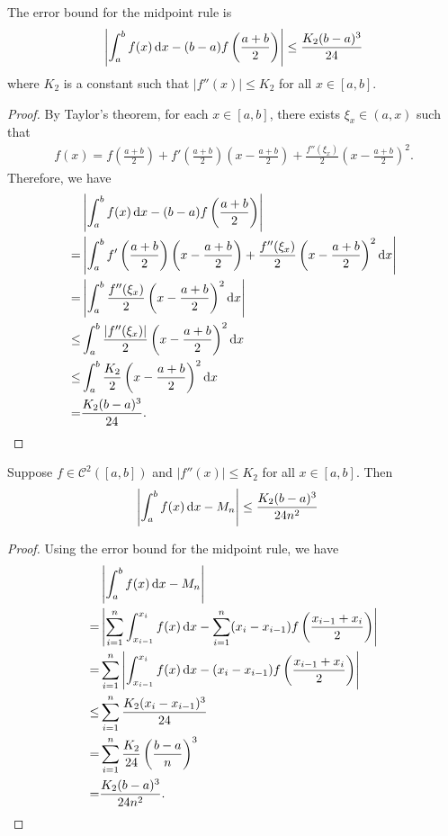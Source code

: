 \begin{theorem}
    The error bound for the midpoint rule is
    \begin{align*}
        \left|\int_{a}^{b} f(x) \operatorname*{d\!} x - (b-a)f\left(\frac{a+b}{2}\right)\right| \le \frac{K_2(b-a)^3}{24}
    \end{align*}
    where $K_2$ is a constant such that $|f''(x)| \le K_2$ for all $x \in [a,b]$.
\end{theorem}
\begin{proof}
    By Taylor's theorem, for each $x \in [a,b]$, there exists $\xi_x \in (a,x)$ such that
    \begin{align*}
        f(x) = f\left(\frac{a+b}{2}\right) + f'\left(\frac{a+b}{2}\right)\left(x-\frac{a+b}{2}\right) + \frac{f''(\xi_x)}{2}\left(x-\frac{a+b}{2}\right)^2.
    \end{align*}
    Therefore, we have
    \begin{align*}
        &\left|\int_{a}^{b} f(x) \operatorname*{d\!} x - (b-a)f\left(\frac{a+b}{2}\right)\right|\\
        =& \left|\int_{a}^{b} f'\left(\frac{a+b}{2}\right)\left(x-\frac{a+b}{2}\right) + \frac{f''(\xi_x)}{2}\left(x-\frac{a+b}{2}\right)^2 \operatorname*{d\!} x\right|\\
        =& \left|\int_{a}^{b} \frac{f''(\xi_x)}{2}\left(x-\frac{a+b}{2}\right)^2 \operatorname*{d\!} x\right|\\
        \le& \int_{a}^{b} \frac{|f''(\xi_x)|}{2}\left(x-\frac{a+b}{2}\right)^2 \operatorname*{d\!} x\\
        \le& \int_{a}^{b} \frac{K_2}{2}\left(x-\frac{a+b}{2}\right)^2 \operatorname*{d\!} x\\
        =& \frac{K_2(b-a)^3}{24}.
    \end{align*}    
\end{proof}

\begin{theorem}
    Suppose $f\in \mathcal{C}^2([a,b])$ and $|f''(x)|\le K_2$ for all $x \in [a,b]$. Then
    \begin{align*}
        \left|\int_{a}^{b} f(x) \operatorname*{d\!} x - M_n\right| &\le \frac{K_2(b-a)^3}{24n^2}
    \end{align*}
\end{theorem}
\begin{proof}
    Using the error bound for the midpoint rule, we have
    \begin{align*}
        &\left|\int_{a}^{b} f(x) \operatorname*{d\!} x - M_n\right|\\
        =& \left|\sum_{i=1}^{n}\int_{x_{i-1}}^{x_i} f(x) \operatorname*{d\!} x - \sum_{i=1}^{n} (x_i - x_{i-1})f\left(\frac{x_{i-1}+x_i}{2}\right)\right|\\
        =& \sum_{i=1}^{n}\left|\int_{x_{i-1}}^{x_i} f(x) \operatorname*{d\!} x - (x_i - x_{i-1})f\left(\frac{x_{i-1}+x_i}{2}\right)\right|\\
        \le& \sum_{i=1}^{n} \frac{K_2(x_i - x_{i-1})^3}{24}\\
        =& \sum_{i=1}^{n} \frac{K_2}{24}\left(\frac{b-a}{n}\right)^3\\
        =& \frac{K_2(b-a)^3}{24n^2}.
    \end{align*}
\end{proof}

